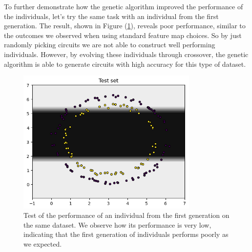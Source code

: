 \documentclass[12pt]{article}
\begin{document}
To further demonstrate how the genetic algorithm improved the performance of the individuals, let's try the same task with an individual from the first generation. The result, shown in Figure (\ref{fig:bad}), reveals poor performance, similar to the outcomes we observed when using standard feature map choices. So by just randomly picking circuits we are not able to construct well performing individuals. However, by evolving these individuals through crossover, the genetic algorithm is able to generate circuits with high accuracy for this type of dataset.
\begin{figure}[h!]
    \centering
    \includegraphics[width=0.8\textwidth]{images/badresult.png}
    \caption{Test of the performance of an individual from the first generation on the same dataset. We observe how its performance is very low, indicating that the first generation of individuals performs poorly as we expected.}
    \label{fig:bad}
\end{figure}
\end{document}
